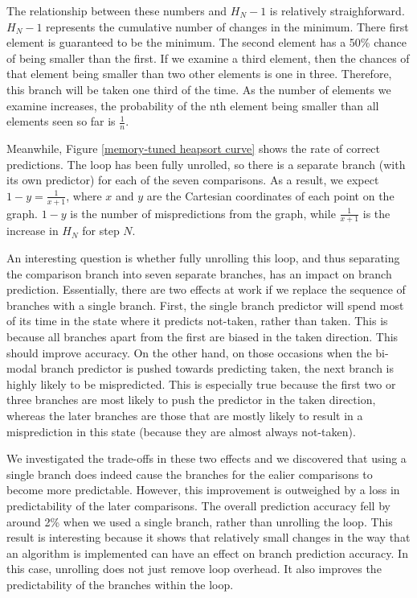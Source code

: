 The relationship between these numbers and $H_N-1$ is relatively straighforward.
$H_N-1$ represents the cumulative number of changes in the minimum. There first
element is guaranteed to be the minimum. The second element has a 50\% chance of
being smaller than the first. If we examine a third element, then the chances of
that element being smaller than two other elements is one in three. Therefore,
this branch will be taken one third of the time. As the number of elements we
examine increases, the probability of the nth element being smaller than all
elements seen so far is $\frac{1}{n}$.

Meanwhile, Figure \ref{memory-tuned heapsort curve} shows the rate of correct
predictions. The loop has been fully unrolled, so there is a separate branch
(with its own predictor) for each of the seven comparisons.  As a result, we
expect $1-y = \frac{1}{x+1}$, where $x$ and $y$ are the Cartesian coordinates of
each point on the graph. $1-y$ is the number of mispredictions from the graph,
while $\frac{1}{x+1}$ is the increase in $H_N$ for step $N$.

An interesting question is whether fully unrolling this loop, and thus
separating the comparison branch into seven separate branches, has an impact on
branch prediction. Essentially, there are two effects at work if we replace the
sequence of branches with a single branch. First, the single branch predictor
will spend most of its time in the state where it predicts not-taken, rather
than taken. This is because all branches apart from the first are biased in the
taken direction. This should improve accuracy. On the other hand, on those
occasions when the bi-modal branch predictor is pushed towards predicting taken,
the next branch is highly likely to be mispredicted. This is especially true
because the first two or three branches are most likely to push the predictor in
the taken direction, whereas the later branches are those that are mostly likely
to result in a misprediction in this state (because they are almost always
not-taken).

We investigated the trade-offs in these two effects and we discovered that using
a single branch does indeed cause the branches for the ealier comparisons to
become more predictable. However, this improvement is outweighed by a loss in
predictability of the later comparisons. The overall prediction accuracy fell by
around 2\% when we used a single branch, rather than unrolling the loop. This
result is interesting because it shows that relatively small changes in the way
that an algorithm is implemented can have an effect on branch prediction
accuracy. In this case, unrolling does not just remove loop overhead. It also
improves the predictability of the branches within the loop.


